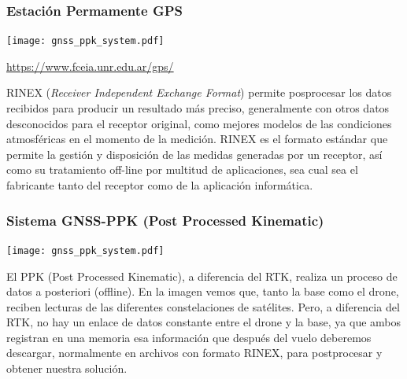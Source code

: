 \begin{frame}
{   }
\end{frame}

\begin{frame}
    \frametitle{Estación Permamente GPS}
    \begin{center}
        \texttt{[image: gnss\_ppk\_system.pdf]}
    \end{center}

    \href{https://www.fceia.unr.edu.ar/gps/}{https://www.fceia.unr.edu.ar/gps/}

    RINEX (\emph{Receiver Independent Exchange Format})  permite posprocesar los datos recibidos para producir un resultado más preciso, generalmente con otros datos desconocidos para el receptor original, como mejores modelos de las condiciones atmosféricas en el momento de la medición.
    RINEX es el formato estándar que permite la gestión y disposición de las medidas generadas por un receptor, así como su tratamiento off-line por multitud de aplicaciones, sea cual sea el fabricante tanto del receptor como de la aplicación informática.

\end{frame}


\begin{frame}
    \frametitle{Sistema GNSS-PPK (Post Processed Kinematic)}
    \begin{center}
        \texttt{[image: gnss\_ppk\_system.pdf]}
    \end{center}

    El PPK (Post Processed Kinematic), a diferencia del RTK, realiza un proceso de datos a posteriori (offline).
    En la imagen vemos que, tanto la base como el drone, reciben lecturas de las diferentes constelaciones de satélites. Pero, a diferencia del RTK, no hay un enlace de datos constante entre el drone y la base, ya que ambos registran en una memoria esa información que después del vuelo deberemos descargar, normalmente en archivos con formato RINEX, para postprocesar y obtener nuestra solución.
    
\end{frame}

